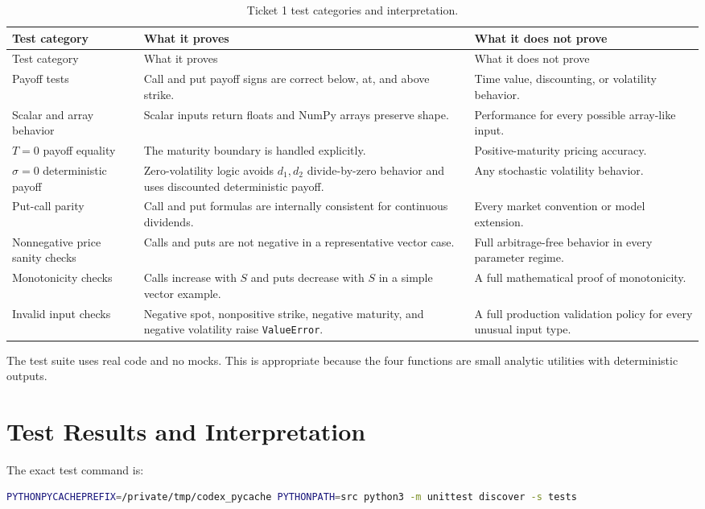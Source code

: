 \documentclass[11pt,a4paper]{article}
\newcommand{\code}[1]{\texttt{#1}}
\begin{document}
\begin{longtable}{p{}p{}p{}}
\caption{Ticket 1 test categories and interpretation.}\label{tab:tests}\\
\toprule
Test category & What it proves & What it does not prove \\
\midrule
\endfirsthead
\toprule
Test category & What it proves & What it does not prove \\
\midrule
\endhead
Payoff tests &
Call and put payoff signs are correct below, at, and above strike. &
Time value, discounting, or volatility behavior. \\
Scalar and array behavior &
Scalar inputs return floats and NumPy arrays preserve shape. &
Performance for every possible array-like input. \\
\(T=0\) payoff equality &
The maturity boundary is handled explicitly. &
Positive-maturity pricing accuracy. \\
\(\sigma=0\) deterministic payoff &
Zero-volatility logic avoids \(d_1,d_2\) divide-by-zero behavior and uses discounted deterministic payoff. &
Any stochastic volatility behavior. \\
Put-call parity &
Call and put formulas are internally consistent for continuous dividends. &
Every market convention or model extension. \\
Nonnegative price sanity checks &
Calls and puts are not negative in a representative vector case. &
Full arbitrage-free behavior in every parameter regime. \\
Monotonicity checks &
Calls increase with \(S\) and puts decrease with \(S\) in a simple vector example. &
A full mathematical proof of monotonicity. \\
Invalid input checks &
Negative spot, nonpositive strike, negative maturity, and negative volatility raise \code{ValueError}. &
A full production validation policy for every unusual input type. \\
\bottomrule
\end{longtable}

The test suite uses real code and no mocks. This is appropriate because the four functions are
small analytic utilities with deterministic outputs.

\section{Test Results and Interpretation}

The exact test command is:
\begin{lstlisting}[language=bash]
PYTHONPYCACHEPREFIX=/private/tmp/codex_pycache PYTHONPATH=src python3 -m unittest discover -s tests
\end{lstlisting}
\end{document}
